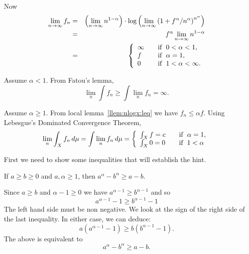 \begin{enumerate}
Now
\begin{eqnarray*}
\lim_{n\to\infty} f_n
 &=& \left(\lim_{n\to\infty} n^{1-\alpha}\right) \cdot
     \log\left(\lim_{n\to\infty}
         \left(1 + f^\alpha/n^\alpha\right)^{n^\alpha}\right) \\
 &=& f^\alpha  \lim_{n\to\infty} n^{1-\alpha} \\
 &=&  \left\{\begin{array}{l@{\qquad}l}
         \infty & \textrm{if }\; 0<\alpha<1,\\
         f      & \textrm{if }\; \alpha = 1,\\
         0      & \textrm{if }\; 1 < \alpha < \infty.
         \end{array}
      \right.
\end{eqnarray*}

Assume \(\alpha<1\).
From Fatou's lemma,
\begin{equation*}
\lim_n \int f_n \geq \int \lim_n f_n = \infty.
\end{equation*}

Assume \(\alpha\geq 1\).
From local lemma~\ref{llem:nlogx:leq} we have \(f_n\leq \alpha f\).
Using Lebesgue's Dominated Convergence Theorem,
\begin{equation*}
\lim_n\int_X f_n\, d\mu = \int \lim_n f_n\,d\mu
 = \left\{\begin{array}{l@{\qquad}l}
         \int_X f = c     & \textrm{if }\; \alpha = 1,\\
         \int_X 0 = 0     & \textrm{if }\; 1 < \alpha
         \end{array}
  \right.
\end{equation*}




\iffalse
First we need to show some inequalities that
will establish the hint.
\begin{llem} \label{llem:apbp:geq}
If \(a \geq b \geq 0\) and \(a,\alpha\geq 1\), then
\(a^\alpha - b^\alpha \geq a - b\).
\end{llem}

\begin{thmproof}
Since \(a\geq b\) and \(\alpha-1\geq 0\) we have
\(a^{\alpha-1} \geq b^{\alpha-1}\) and so
\begin{equation*}
a^{\alpha-1} - 1 \geq b^{\alpha-1} - 1
\end{equation*}
The left hand side must be non negative.
We look at the sign of the right side of the last inequality.
In either case, we can deduce:
\begin{equation*}
a (a^{\alpha-1} - 1) \geq b(b^{\alpha-1} - 1).
\end{equation*}
The above is equivalent to
\begin{equation*}
a^\alpha - b^\alpha \geq a - b.
\end{equation*}
\end{thmproof}



\end{enumerate}
